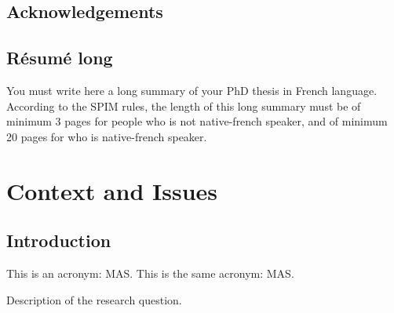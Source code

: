 \documentclass[english]{spimumlpphdthesis}
\begin{document}
\frontmatter

\chapter*{Acknowledgements}

\tableofcontents

\chapter*{R\'esum\'e long}

\begin{upmcaution}
	You must write here a long summary of your PhD thesis in French language.
	According to the SPIM rules, the length of this long summary must be of minimum 3 pages for people who is not native-french speaker, and of minimum 20 pages for who is native-french speaker.
\end{upmcaution}


\printacronyms

\mainmatter

\part{Context and Issues}

\chapter{Introduction}

This is an acronym: \ac{MAS}.
This is the same acronym: \ac{MAS}.

\begin{researchquestion}[a name]
   Description of the research question.
\end{researchquestion}
\end{document}
